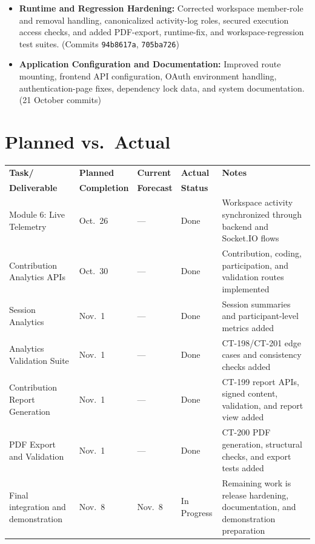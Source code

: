 \documentclass[11pt,a4paper]{article}
\begin{document}
\begin{itemize}
    \item \textbf{Runtime and Regression Hardening:} Corrected workspace member-role and removal handling, canonicalized activity-log roles, secured execution access checks, and added PDF-export, runtime-fix, and workspace-regression test suites. (Commits \texttt{94b8617a}, \texttt{705ba726})
    \item \textbf{Application Configuration and Documentation:} Improved route mounting, frontend API configuration, OAuth environment handling, authentication-page fixes, dependency lock data, and system documentation. (21 October commits)
\end{itemize}

\section{Planned vs.\ Actual}

\small
\begin{tabularx}{\textwidth}{p{} p{} p{} p{} Y}
\toprule
\textbf{Task/} & \textbf{Planned} & \textbf{Current} & \textbf{Actual} & \textbf{Notes} \\
\textbf{Deliverable} & \textbf{Completion} & \textbf{Forecast} & \textbf{Status} & \\
\midrule
Module 6: Live Telemetry & Oct.\ 26 & --- & Done & Workspace activity synchronized through backend and Socket.IO flows \\
Contribution Analytics APIs & Oct.\ 30 & --- & Done & Contribution, coding, participation, and validation routes implemented \\
Session Analytics & Nov.\ 1 & --- & Done & Session summaries and participant-level metrics added \\
Analytics Validation Suite & Nov.\ 1 & --- & Done & CT-198/CT-201 edge cases and consistency checks added \\
Contribution Report Generation & Nov.\ 1 & --- & Done & CT-199 report APIs, signed content, validation, and report view added \\
PDF Export and Validation & Nov.\ 1 & --- & Done & CT-200 PDF generation, structural checks, and export tests added \\
Final integration and demonstration & Nov.\ 8 & Nov.\ 8 & In Progress & Remaining work is release hardening, documentation, and demonstration preparation \\
\bottomrule
\end{tabularx}
\normalsize
\end{document}
